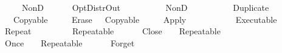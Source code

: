 \ \ \ \ \ \ \ {\isasymodot}\ {\isacharparenleft}NonD\ \ \isanewline
\ \ {\isacharbar}\ {\isachardoublequoteopen}\ {\isacharparenleft}OptDistrOut\ \ \ \ {\isacharequal}\isanewline
\ \ \ \ \ \ NonD\ {\isacharparenleft}\ {\isasymodot}\ \ {\isacharparenleft}\ {\isasymodot}\ \isanewline
\ \ {\isacharbar}\ {\isachardoublequoteopen}\ {\isacharparenleft}Duplicate\ \ {\isacharequal}\isanewline
\ \ \ \ \ \ Copyable\ \isanewline
\ \ {\isacharbar}\ {\isachardoublequoteopen}\ {\isacharparenleft}Erase\ \ {\isacharequal}\ Copyable\ \isanewline
\ \ {\isacharbar}\ {\isachardoublequoteopen}\ {\isacharparenleft}Apply\ \ \ {\isacharequal}\isanewline
\ \ \ \ \ \ \ {\isasymodot}\ {\isacharparenleft}Executable\ \ \isanewline
\ \ {\isacharbar}\ {\isachardoublequoteopen}\ {\isacharparenleft}Repeat\ \ \ {\isacharequal}\isanewline
\ \ \ \ \ \ Repeatable\ \ \isanewline
\ \ {\isacharbar}\ {\isachardoublequoteopen}\ {\isacharparenleft}Close\ \ \ {\isacharequal}\ Repeatable\ \ \isanewline
\ \ {\isacharbar}\ {\isachardoublequoteopen}\ {\isacharparenleft}Once\ \ \ {\isacharequal}\ Repeatable\ \ \isanewline
\ \ {\isacharbar}\ {\isachardoublequoteopen}\ {\isacharparenleft}Forget\ \ {\isacharequal}\ 
